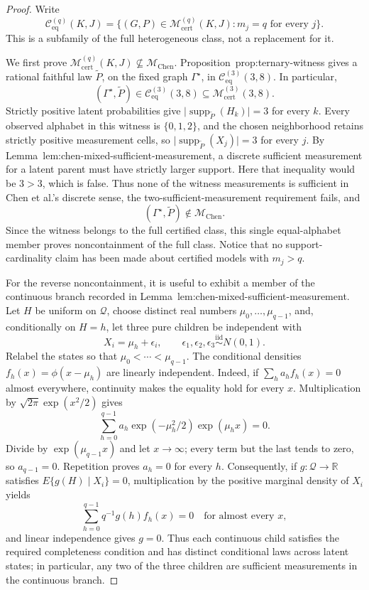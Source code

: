 \documentclass{article}
\begin{document}
\begin{proof}
Write
\[
 \mathcal C_{\mathrm{eq}}^{(q)}(K,J)
 =\bigl\{(G,P)\in\mathcal M_{\mathrm{cert}}^{(q)}(K,J):m_j=q
   \text{ for every }j\bigr\}.
\]
This is a subfamily of the full heterogeneous class, not a replacement for it.

We first prove \(\mathcal M_{\mathrm{cert}}^{(q)}(K,J)\not\subseteq\mathcal M_{\mathrm{Chen}}\).  Proposition~\textnormal{prop:ternary-witness} gives a rational faithful law \(\widetilde P\), on the fixed graph \(\Gamma^{\star}\), in
\(\mathcal C_{\mathrm{eq}}^{(3)}(3,8)\).  In particular,
\[
 (\Gamma^{\star},\widetilde P)
 \in\mathcal C_{\mathrm{eq}}^{(3)}(3,8)
 \subseteq\mathcal M_{\mathrm{cert}}^{(3)}(3,8).
\]
Strictly positive latent probabilities give
\(\lvert\operatorname{supp}_{\widetilde P}(H_k)\rvert=3\) for every \(k\).  Every observed alphabet in this witness is \(\{0,1,2\}\), and the chosen neighborhood retains strictly positive measurement cells, so
\(\lvert\operatorname{supp}_{\widetilde P}(X_j)\rvert=3\) for every \(j\).  By Lemma~\textnormal{lem:chen-mixed-sufficient-measurement}, a discrete sufficient measurement for a latent parent must have strictly larger support.  Here that inequality would be \(3>3\), which is false.  Thus none of the witness measurements is sufficient in Chen et al.'s discrete sense, the two-sufficient-measurement requirement fails, and
\[
 (\Gamma^{\star},\widetilde P)\notin\mathcal M_{\mathrm{Chen}}.
\]
Since the witness belongs to the full certified class, this single equal-alphabet member proves noncontainment of the full class.  Notice that no support-cardinality claim has been made about certified models with \(m_j>q\).

For the reverse noncontainment, it is useful to exhibit a member of the continuous branch recorded in Lemma~\textnormal{lem:chen-mixed-sufficient-measurement}.  Let \(H\) be uniform on \(\mathcal Q\), choose distinct real numbers \(\mu_0,\ldots,\mu_{q-1}\), and, conditionally on \(H=h\), let three pure children be independent with
\[
 X_i=\mu_h+\epsilon_i,\qquad
 \epsilon_1,\epsilon_2,\epsilon_3\stackrel{\mathrm{iid}}{\sim}N(0,1).
\]
Relabel the states so that \(\mu_0<\cdots<\mu_{q-1}\).  The conditional densities \(f_h(x)=\phi(x-\mu_h)\) are linearly independent.  Indeed, if
\(\sum_h a_h f_h(x)=0\) almost everywhere, continuity makes the equality hold for every \(x\).  Multiplication by \(\sqrt{2\pi}\exp(x^2/2)\) gives
\[
 \sum_{h=0}^{q-1}a_h\exp(-\mu_h^2/2)\exp(\mu_h x)=0.
\]
Divide by \(\exp(\mu_{q-1}x)\) and let \(x\to\infty\); every term but the last tends to zero, so \(a_{q-1}=0\).  Repetition proves \(a_h=0\) for every \(h\).  Consequently, if \(g:\mathcal Q\to\mathbb R\) satisfies \(E\{g(H)\mid X_i\}=0\), multiplication by the positive marginal density of \(X_i\) yields
\[
 \sum_{h=0}^{q-1}q^{-1}g(h)f_h(x)=0
 \quad\text{for almost every }x,
\]
and linear independence gives \(g=0\).  Thus each continuous child satisfies the required completeness condition and has distinct conditional laws across latent states; in particular, any two of the three children are sufficient measurements in the continuous branch.


\end{proof}
\end{document}
